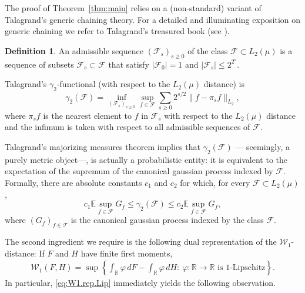 \documentclass[11pt]{amsart}
\newcommand{\R}{\mathbb{R}}
\newcommand{\W}{\mathcal{W}}
\theoremstyle{definition}
\newtheorem{definition}[theorem]{Definition}
\newcommand{\E}{\mathbb{E}}
\numberwithin{equation}{section}
\begin{document}
The proof of Theorem~\ref{thm:main} relies on a (non-standard) variant of Talagrand’s generic chaining theory.
For a detailed and illuminating exposition on generic chaining we refer to Talagrand's treasured book 
(see \cite{talagrand2022upper}).



\begin{definition}
	An admissible sequence $(\mathcal{F}_{s})_{s\geq 0}$ of the class $\mathcal{F} \subset L_2(\mu)$ is a sequence of subsets $\mathcal{F}_s \subset \mathcal{F}$ that satisfy $|\mathcal{F}_{0}|=1$ and $|\mathcal{F}_{s}|\leq 2^{2^{s}}$. 

	Talagrand's $\gamma_{2}$-functional (with respect to the $L_2(\mu)$ distance) is
	\[ \gamma_{2}(\mathcal{F}) = \inf_{(\mathcal{F}_{s})_{s\geq 0}} \sup_{f\in\mathcal{F}} \sum_{s\geq 0} 2^{s/2} \| f-\pi_{s}f\|_{L_{2}},\]
	where $\pi_{s}f$ is the nearest element to $f$ in $\mathcal{F}_{s}$ with respect to the $L_{2}(\mu)$ distance and the infimum is taken with respect to all admissible sequences of $\mathcal{F}$.
\end{definition}


Talagrand's majorizing measures theorem \cite{talagrand1987regularity} implies that $\gamma_2(\mathcal{F})$ --- seemingly, a purely metric object---, is actually a probabilistic entity: it is equivalent to the expectation of the supremum of the canonical gaussian process indexed by $\mathcal{F}$. Formally, there are absolute constants $c_{1}$ and $c_{2}$ for which, for every $\mathcal{F} \subset L_2(\mu)$,  
$$
c_{1} \E \sup_{f\in\mathcal{F}} G_{f} \leq \gamma_{2}(\mathcal{F}) \leq c_{2} \E \sup_{f\in\mathcal{F}} G_{f},
$$ 
where $(G_{f})_{f\in\mathcal{F}}$ is the canonical gaussian process indexed by the class $\mathcal{F}$.

The second ingredient we require is the following dual representation of the $\W_1$-distance:
If $F$ and $H$ have finite first moments,
\begin{align}
\label{eq:W1.rep.Lip}
\W_{1}(F,H)
= \sup\left\{ 
\int_{\mathbb{R}} \varphi \, dF - \int_{\mathbb{R}} \varphi \, dH 
:\ \varphi\colon \R \to \R \text{ is $1$-Lipschitz}
\right\}.
\end{align}
In particular, \eqref{eq:W1.rep.Lip} immediately yields the following observation.
\end{document}
